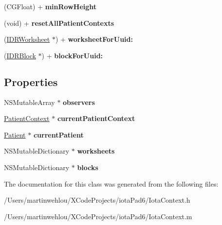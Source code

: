 \begin{DoxyCompactItemize}
\item 
\hypertarget{interface_iota_context_aa885191f812dd455dfb7565a63fc363d}{
(CGFloat) + {\bfseries minRowHeight}}
\label{interface_iota_context_aa885191f812dd455dfb7565a63fc363d}

\item 
\hypertarget{interface_iota_context_a76f7acf9eaa0e985b0311a381c89c473}{
(void) + {\bfseries resetAllPatientContexts}}
\label{interface_iota_context_a76f7acf9eaa0e985b0311a381c89c473}

\item 
\hypertarget{interface_iota_context_afc91c8cac311b420d3ce1af349186227}{
(\hyperlink{interface_i_d_r_worksheet}{IDRWorksheet} $\ast$) + {\bfseries worksheetForUuid:}}
\label{interface_iota_context_afc91c8cac311b420d3ce1af349186227}

\item 
\hypertarget{interface_iota_context_aa43e2926c00bfbbfe55c4a552a9087c8}{
(\hyperlink{interface_i_d_r_block}{IDRBlock} $\ast$) + {\bfseries blockForUuid:}}
\label{interface_iota_context_aa43e2926c00bfbbfe55c4a552a9087c8}

\end{DoxyCompactItemize}
\subsection*{Properties}
\begin{DoxyCompactItemize}
\item 
\hypertarget{interface_iota_context_a0753cf726c150fa15d8354764cb64d6d}{
NSMutableArray $\ast$ {\bfseries observers}}
\label{interface_iota_context_a0753cf726c150fa15d8354764cb64d6d}

\item 
\hypertarget{interface_iota_context_ac9e2fa93dc8e7fe0ca92989c7d829fc0}{
\hyperlink{interface_patient_context}{PatientContext} $\ast$ {\bfseries currentPatientContext}}
\label{interface_iota_context_ac9e2fa93dc8e7fe0ca92989c7d829fc0}

\item 
\hypertarget{interface_iota_context_ab32cc9082a9f423d95c212e4e9914b60}{
\hyperlink{interface_patient}{Patient} $\ast$ {\bfseries currentPatient}}
\label{interface_iota_context_ab32cc9082a9f423d95c212e4e9914b60}

\item 
\hypertarget{interface_iota_context_aad6930e015af8e85f6edcec0c797a7a8}{
NSMutableDictionary $\ast$ {\bfseries worksheets}}
\label{interface_iota_context_aad6930e015af8e85f6edcec0c797a7a8}

\item 
\hypertarget{interface_iota_context_a8f8bfb5e6cf6ee5ef43decedcec86ae8}{
NSMutableDictionary $\ast$ {\bfseries blocks}}
\label{interface_iota_context_a8f8bfb5e6cf6ee5ef43decedcec86ae8}

\end{DoxyCompactItemize}


The documentation for this class was generated from the following files:\begin{DoxyCompactItemize}
\item 
/Users/martinwehlou/XCodeProjects/iotaPad6/IotaContext.h\item 
/Users/martinwehlou/XCodeProjects/iotaPad6/IotaContext.m\end{DoxyCompactItemize}
